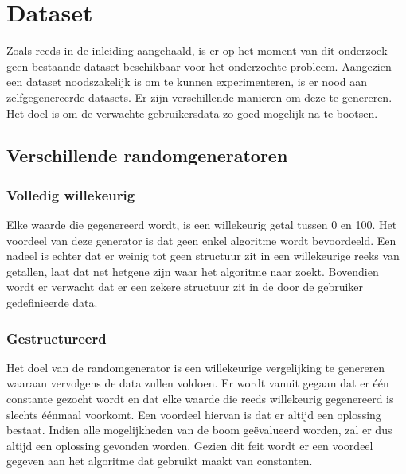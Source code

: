 \documentclass[Main.tex]{subfiles}
\begin{document}
\section{Dataset}

Zoals reeds in de inleiding aangehaald, is er op het moment van dit onderzoek geen bestaande dataset beschikbaar voor het onderzochte probleem. Aangezien een dataset noodszakelijk is om te kunnen experimenteren, is er nood aan zelfgegenereerde datasets. Er zijn verschillende manieren om deze te genereren. Het doel is om de verwachte gebruikersdata zo goed mogelijk na te bootsen.
  
\subsection{Verschillende randomgeneratoren}
\subsubsection*{Volledig willekeurig}
Elke waarde die gegenereerd wordt, is een willekeurig getal tussen 0 en 100. Het voordeel van deze generator is dat geen enkel algoritme wordt bevoordeeld. Een nadeel is echter dat er weinig tot geen structuur zit in een willekeurige reeks van getallen, laat dat net hetgene zijn waar het algoritme naar zoekt. Bovendien wordt er verwacht dat er een zekere structuur zit in de door de gebruiker gedefinieerde data.

\subsubsection*{Gestructureerd}
Het doel van de randomgenerator is een willekeurige vergelijking te genereren waaraan vervolgens de data zullen voldoen. Er wordt vanuit gegaan dat er \'e\'en constante gezocht wordt en dat elke waarde die reeds willekeurig gegenereerd is slechts \'e\'enmaal voorkomt. Een voordeel hiervan is dat er altijd een oplossing bestaat. Indien alle mogelijkheden van de boom ge\"evalueerd worden, zal er dus altijd een oplossing gevonden worden. Gezien dit feit wordt er een voordeel gegeven aan het algoritme dat gebruikt maakt van constanten.
\end{document}
